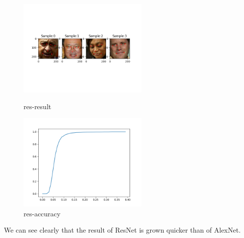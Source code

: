 \documentclass{article}
\begin{document}
\begin{figure}[h]
	\begin{minipage}[t]{0.5\linewidth}
		\centering
		\includegraphics[width=2.5in]{resresult.png}
		\caption{res-result}
	\end{minipage}%
	\begin{minipage}[t]{0.5\linewidth}
		\centering
		\includegraphics[width=2.5in]{resradius.png}
		\caption{res-accuracy}
	\end{minipage}
\end{figure}

We can see clearly that the result of ResNet is grown quicker than of AlexNet.



\end{document}
